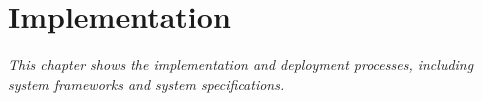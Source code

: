 \chapter{Implementation}
\label{chap:implementation}
	\textit{This chapter shows the implementation and deployment processes, including system frameworks and system specifications.}
\minitoc


% 		

